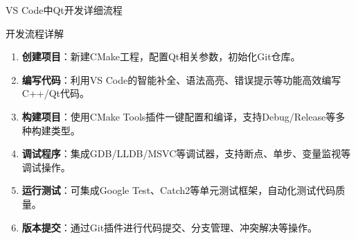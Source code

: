 \documentclass[UTF8,aspectratio=169]{beamer}
\begin{document}
\begin{frame}{VS Code中Qt开发详细流程}
    \begin{ytublock}{开发流程详解}
        \begin{enumerate}
            \item \textbf{创建项目}：新建CMake工程，配置Qt相关参数，初始化Git仓库。
            \item \textbf{编写代码}：利用VS Code的智能补全、语法高亮、错误提示等功能高效编写C++/Qt代码。
            \item \textbf{构建项目}：使用CMake Tools插件一键配置和编译，支持Debug/Release等多种构建类型。
            \item \textbf{调试程序}：集成GDB/LLDB/MSVC等调试器，支持断点、单步、变量监视等调试操作。
            \item \textbf{运行测试}：可集成Google Test、Catch2等单元测试框架，自动化测试代码质量。
            \item \textbf{版本提交}：通过Git插件进行代码提交、分支管理、冲突解决等操作。
        \end{enumerate}
    \end{ytublock}
\end{frame}
\end{document}
